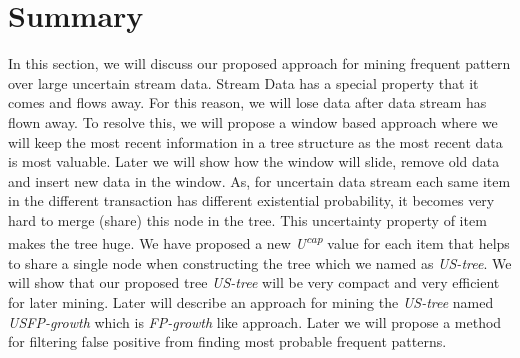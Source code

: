     \section{Summary}
    In this section, we will discuss our proposed approach for mining frequent pattern over large uncertain stream data. Stream Data has a special property that it comes and flows away. For this reason, we will lose data after data stream has flown away. To resolve this, we will propose a window based approach where we will keep the most recent information in a tree structure as the most recent data is most valuable. Later we will show how the window will slide, remove old data and insert new data in the window. As, for uncertain data stream each same item in the different transaction has different existential probability, it becomes very hard to merge (share) this node in the tree. This uncertainty property of item makes the tree huge. We have proposed a new \emph{U\textsuperscript{cap}} value for each item that helps to share a single node when constructing the tree which we named as \emph{US-tree}. We will show that our proposed tree \emph{US-tree} will be very compact and very efficient for later mining. Later will describe an approach for mining the \emph {US-tree} named \emph{USFP-growth} which is \emph{FP-growth} like approach. Later we will propose a method for filtering false positive from finding most probable frequent patterns.
%